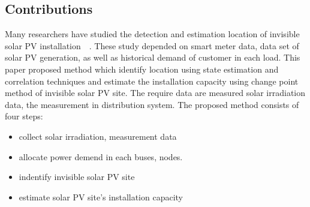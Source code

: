\subsection{Contributions}
Many researchers have studied the detection and estimation location of invisible solar PV installation~\cite{b11}~\cite{b14}.
These study depended on smart meter data, data set of solar PV generation, as well as historical demand of customer in each load.
This paper proposed method which identify location using state estimation and correlation techniques and estimate the installation capacity using change point method of invisible solar PV site.
The require data are measured solar irradiation data, the measurement in distribution system.
The proposed method consists of four steps:
\begin{itemize}
  \item collect solar irradiation, measurement data
  \item allocate power demend in each buses, nodes.
  \item indentify invisible solar PV site
  \item estimate solar PV site's installation capacity
\end{itemize}
